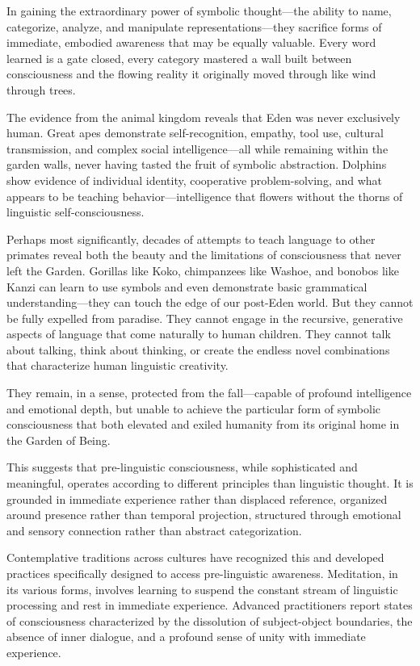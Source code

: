 In gaining the extraordinary power of symbolic thought—the ability to name, categorize, analyze, and manipulate representations—they sacrifice forms of immediate, embodied awareness that may be equally valuable. Every word learned is a gate closed, every category mastered a wall built between consciousness and the flowing reality it originally moved through like wind through trees.

The evidence from the animal kingdom reveals that Eden was never exclusively human. Great apes demonstrate self-recognition, empathy, tool use, cultural transmission, and complex social intelligence—all while remaining within the garden walls, never having tasted the fruit of symbolic abstraction. Dolphins show evidence of individual identity, cooperative problem-solving, and what appears to be teaching behavior—intelligence that flowers without the thorns of linguistic self-consciousness.

Perhaps most significantly, decades of attempts to teach language to other primates reveal both the beauty and the limitations of consciousness that never left the Garden. Gorillas like Koko, chimpanzees like Washoe, and bonobos like Kanzi can learn to use symbols and even demonstrate basic grammatical understanding—they can touch the edge of our post-Eden world. But they cannot be fully expelled from paradise. They cannot engage in the recursive, generative aspects of language that come naturally to human children. They cannot talk about talking, think about thinking, or create the endless novel combinations that characterize human linguistic creativity.

They remain, in a sense, protected from the fall—capable of profound intelligence and emotional depth, but unable to achieve the particular form of symbolic consciousness that both elevated and exiled humanity from its original home in the Garden of Being.

This suggests that pre-linguistic consciousness, while sophisticated and meaningful, operates according to different principles than linguistic thought. It is grounded in immediate experience rather than displaced reference, organized around presence rather than temporal projection, structured through emotional and sensory connection rather than abstract categorization.

Contemplative traditions across cultures have recognized this and developed practices specifically designed to access pre-linguistic awareness. Meditation, in its various forms, involves learning to suspend the constant stream of linguistic processing and rest in immediate experience. Advanced practitioners report states of consciousness characterized by the dissolution of subject-object boundaries, the absence of inner dialogue, and a profound sense of unity with immediate experience.

